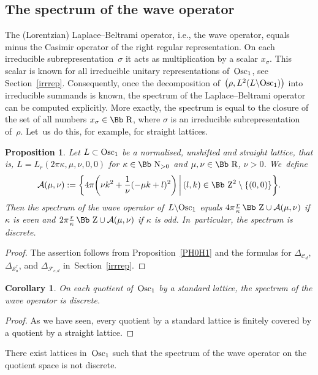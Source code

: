 \documentclass[10pt,a4paper]{amsart}
\newcommand\RR{{\mbox{\Bb R}}}
\newcommand\NN{{\mbox{\Bb N}}}
\newcommand\ZZ{{\mbox{\Bb Z}}}
\newcommand\cC{{\mathcal C}}
\newcommand\cA{{\mathcal A}}
\newcommand\cF{{\mathcal F}}
\newcommand{\Osc}{{\rm Osc}}
\numberwithin{equation}{section}
\newtheorem{Corollary}[Theorem]{Corollary}
\newtheorem{Proposition}[Theorem]{Proposition}
 { \theoremstyle{definition}
\newtheorem{Definition}[Theorem]{Definition}
\newtheorem{Note}[Theorem]{Note}
\newtheorem{Example}[Theorem]{Example}
\newtheorem{Remark}[Theorem]{Remark} }
\begin{document}
\subsection{The spectrum of the wave operator} \label{rmwave}
The (Lorentzian) Laplace--Beltrami operator, i.e., the wave operator, equals minus the Casimir operator of the right regular representation. On each irreducible subrepresentation~$\sigma$ it acts as multiplication by a scalar $x_\sigma$. This scalar is known for all irreducible unitary representations of~$\Osc_1$, see Section~\ref{irrrep}. Consequently, once the decomposition of~$\big(\rho,L^2(L\backslash\Osc_1)\big)$ into irreducible summands is known, the spectrum of the Laplace--Beltrami operator can be computed explicitly. More exactly, the spectrum is equal to the closure of the set of all numbers $x_\sigma\in\RR$, where $\sigma$ is an irreducible subrepresentation of~$\rho$. Let~us do this, for example, for straight lattices.

\begin{Proposition} Let $L\subset\Osc_1$ be a normalised, unshifted and straight lattice, that is, $L=L_r(2\pi\kappa,\mu,\nu,0,0)$ for $\kappa\in\NN_{>0}$ and $\mu,\nu\in\RR$, $\nu>0$. We~define
\begin{gather*}
\cA(\mu,\nu):=\bigg\{4\pi \bigg(\nu
k^2+\frac1\nu(-\mu k+l)^2\bigg)\, \bigg|\, (l,k)\in\ZZ^2\setminus\{(0,0)\}\bigg\}.
\end{gather*}
Then the spectrum of the wave operator of~$L\backslash \Osc_1$ equals
$4\pi\frac r\kappa\,\ZZ\cup \cA(\mu,\nu)$ if $\kappa$ is even and $2\pi\frac r\kappa\,\ZZ\cup \cA(\mu,\nu)$ if $\kappa$ is odd. In~particular, the spectrum is discrete.
\end{Proposition}

\begin{proof}The assertion follows from Proposition~\ref{PH0H1} and the formulas for $\Delta_{\cC_d}$, $\Delta_{{\mathcal S}_a^\tau}$, and $\Delta_{\cF_{c,d}}$ in~Section~\ref{irrrep}.
\end{proof}

\begin{Corollary}On each quotient of~$\Osc_1$ by a standard lattice, the spectrum of the wave operator is discrete.
\end{Corollary}
\begin{proof}
As we have seen, every quotient by a standard lattice is finitely covered by a quotient by a straight lattice.
\end{proof}

There exist lattices in~$\Osc_1$ such that the spectrum of the wave operator on the quotient space is not discrete.
\end{document}

